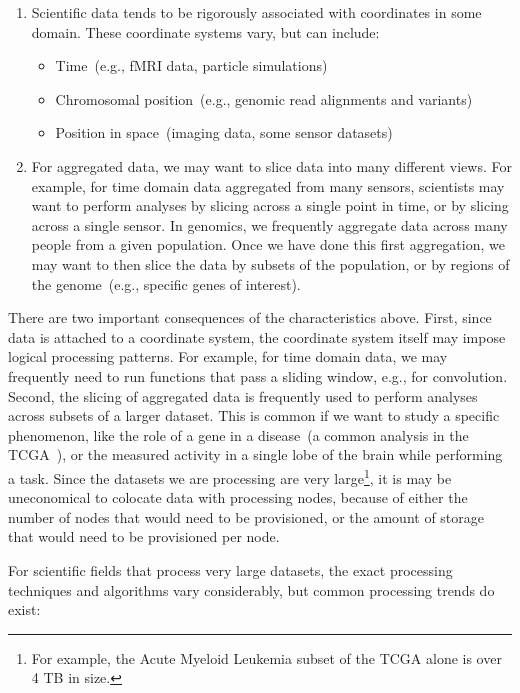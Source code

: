 \documentclass{acm_proc_article-sp}
\begin{document}
\begin{enumerate}
\item Scientific data tends to be rigorously associated with coordinates in some domain. These coordinate
systems vary, but can include:
\begin{itemize}
\item Time~(e.g., fMRI data, particle simulations)
\item Chromosomal position~(e.g., genomic read alignments and variants)
\item Position in space~(imaging data, some \linebreak sensor datasets)
\end{itemize}
\item For aggregated data, we may want to slice data into many different views. For example, for time
domain data aggregated from many sensors, scientists may \linebreak want to perform analyses by slicing
across a single point in time, or by slicing across a single sensor. In genomics, we frequently aggregate data
across many people from a given population. Once we have done this first aggregation, we may want to then
slice the data by subsets of the population, or by regions of the genome~(e.g., specific genes of interest).
\end{enumerate}

There are two important consequences of the characteristics above. First, since data is attached to a
coordinate system, the coordinate system itself may impose logical processing patterns. For example, for
time domain data, we may frequently need to run functions that pass a sliding window, e.g., for
convolution. Second, the slicing of aggregated data is frequently used to perform analyses across
subsets of a larger dataset. This is common if we want to study a specific phenomenon, like the role of a
gene in a disease~(a common analysis in the TCGA~\cite{weinstein13}), or the measured activity in a
single lobe of the brain while performing a task. Since the datasets we are processing are very
large\footnote{For example, the Acute Myeloid Leukemia subset of the TCGA alone is over 4 TB in size.},
it is may be uneconomical to colocate data with processing nodes, because of either the number of
nodes that would need to be provisioned, or the amount of storage that would need to be provisioned
per node.

For scientific fields that process very large datasets, the exact processing techniques and algorithms vary
considerably, but common processing trends do exist:
\end{document}
